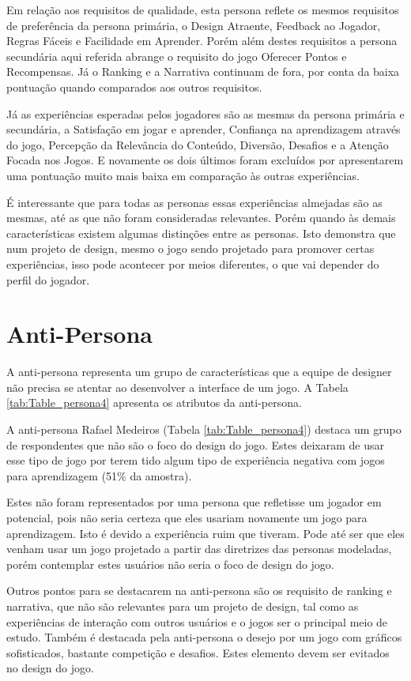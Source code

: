 Em relação aos requisitos de qualidade, esta persona reflete os mesmos requisitos de preferência da persona primária, o Design Atraente, Feedback ao Jogador, Regras Fáceis e Facilidade em Aprender. Porém além destes requisitos a persona secundária aqui referida abrange o requisito do jogo Oferecer Pontos e Recompensas. Já o Ranking e a Narrativa continuam de fora, por conta da baixa pontuação quando comparados aos outros requisitos.

Já as experiências esperadas pelos jogadores são as mesmas da persona primária e secundária, a Satisfação em jogar e aprender, Confiança na aprendizagem através do jogo, Percepção da Relevância do Conteúdo, Diversão, Desafios e a Atenção Focada nos Jogos. E novamente os dois últimos foram excluídos por apresentarem uma pontuação muito mais baixa em comparação às outras experiências. 

É interessante que para todas as personas essas experiências almejadas são as mesmas, até as que não foram consideradas relevantes. Porém quando às demais características existem algumas distinções entre as personas. Isto demonstra que num projeto de design, mesmo o jogo sendo projetado para promover certas experiências, isso pode acontecer por meios diferentes, o que vai depender do perfil do jogador.


\section{Anti-Persona}
\label{sec:p4}

A anti-persona representa um grupo de características que a equipe de designer não precisa se atentar ao desenvolver a interface de um jogo. A Tabela \ref{tab:Table_persona4} apresenta os atributos da anti-persona.
\newpage



A anti-persona Rafael Medeiros (Tabela \ref{tab:Table_persona4}) destaca um grupo de respondentes que não são o foco do design do jogo. Estes deixaram de usar esse tipo de jogo por terem tido algum tipo de experiência negativa com jogos para aprendizagem (51\% da amostra). 

Estes não foram representados por uma persona que refletisse um jogador em potencial, pois não seria certeza que eles usariam novamente um jogo para aprendizagem. Isto é devido a experiência ruim que tiveram. Pode até ser que eles venham usar um jogo projetado a partir das diretrizes das personas modeladas, porém contemplar estes usuários não seria o foco de design do jogo.

Outros pontos para se destacarem na anti-persona são os requisito de ranking e narrativa, que não são relevantes para um projeto de design, tal como as experiências de interação com outros usuários e o jogos ser o principal meio de estudo. Também é destacada pela anti-persona o desejo por um jogo com gráficos sofisticados, bastante competição e desafios. Estes elemento devem ser evitados no design do jogo. 

